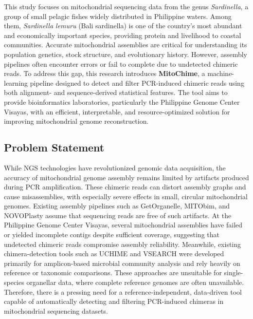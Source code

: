 This study focuses on mitochondrial sequencing data from the genus \textit{Sardinella}, a group of small pelagic fishes widely distributed in Philippine waters. Among them, \textit{Sardinella lemuru} (Bali sardinella) is one of the country’s most abundant and economically important species, providing protein and livelihood to coastal communities\cite{Willette2011,Labrador2021}. Accurate mitochondrial assemblies are critical for understanding its population genetics, stock structure, and evolutionary history. However, assembly pipelines often encounter errors or fail to complete due to undetected chimeric reads. To address this gap, this research introduces \textbf{MitoChime}, a machine-learning pipeline designed to detect and filter PCR-induced chimeric reads using both alignment- and sequence-derived statistical features. The tool aims to provide bioinformatics laboratories, particularly the Philippine Genome Center Visayas, with an efficient, interpretable, and resource-optimized solution for improving mitochondrial genome reconstruction.

\subsection{Problem Statement}\label{subsec:probstatement}

While NGS technologies have revolutionized genomic data acquisition, the accuracy of mitochondrial genome assembly remains limited by artifacts produced during PCR amplification. These chimeric reads can distort assembly graphs and cause misassemblies, with especially severe effects in small, circular mitochondrial genomes\cite{Boore1999,Cameron2014}. Existing assembly pipelines such as GetOrganelle, MITObim, and NOVOPlasty assume that sequencing reads are free of such artifacts\cite{Hahn2013,Dierckxsens2017,Jin2020}. At the Philippine Genome Center Visayas, several mitochondrial assemblies have failed or yielded incomplete contigs despite sufficient coverage, suggesting that undetected chimeric reads compromise assembly reliability. Meanwhile, existing chimera-detection tools such as UCHIME and VSEARCH were developed primarily for amplicon-based microbial community analysis and rely heavily on reference or taxonomic comparisons\cite{Edgar2011,Rognes2016}. These approaches are unsuitable for single-species organellar data, where complete reference genomes are often unavailable. Therefore, there is a pressing need for a reference-independent, data-driven tool capable of automatically detecting and filtering PCR-induced chimeras in mitochondrial sequencing datasets.

